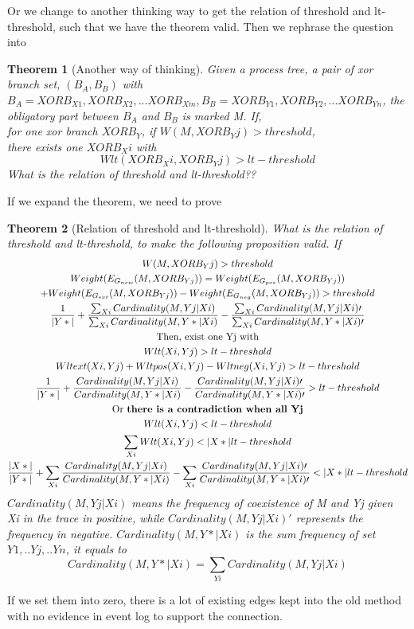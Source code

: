 \documentclass[]{article}
\newtheorem{mytheorem}{Theorem}[section]
\begin{document}
Or we change to another thinking way to get the relation of threshold and lt-threshold, such that we have the theorem valid. Then we rephrase the question into
\begin{mytheorem}[Another way of thinking]
	Given a process tree, a pair of xor branch set, $(B_A,B_B)$ with $B_A={XORB_{X1}, XORB_{X2},...XORB_{Xm}}, B_B={XORB_{Y1}, XORB_{Y2},...XORB_{Yn}}$, the obligatory part between $B_A$ and $B_B$ is marked M. If,\\
	for one xor branch $XORB_Y$, if $W(M, XORB_Yj) > threshold$, \\ there exists one $XORB_Xi$ with 
	\[Wlt(XORB_Xi, XORB_Yj)> lt-threshold\]
	What is the relation of threshold and lt-threshold?? 
\end{mytheorem}
If we expand the theorem, we need to prove 
\begin{mytheorem}[Relation of threshold and lt-threshold]
	What is the relation of threshold and lt-threshold, to make the following proposition valid. If 
	\begin{equation*}
	 \begin{gathered}
		W(M, XORB_Yj)  > threshold \\
	Weight(E_{G_{new}}(M, XORB_{Yj})) = Weight(E_{G_{pos}}(M, XORB_{Yj})) \\
	+ Weight(E_{G_{ext}}(M, XORB_{Yj})) 
	- Weight(E_{G_{neg}}(M, XORB_{Yj}))  > threshold \\
	\frac{1}{|Y*|} + \frac{\sum_{Xi}{Cardinality(M,Yj|Xi)}} {\sum_{Xi}{Cardinality(M,Y*|Xi)}}  
	- \frac{\sum_{Xi}{Cardinality(M,Yj|Xi)\prime}} {\sum_{Xi}{Cardinality(M,Y*|Xi)\prime}} \\
	\text{Then, exist one Yj with}\\
	Wlt(Xi, Yj)> lt-threshold \\
	Wlt{ext}(Xi, Yj) + Wlt{pos}(Xi, Yj) -Wlt{neg}(Xi, Yj) > lt-threshold\\
	\frac{1}{|Y*|} + \frac{Cardinality(M,Yj|Xi)} {Cardinality(M,Y*|Xi)}  
	- \frac{Cardinality(M,Yj|Xi)\prime} {Cardinality(M,Y*|Xi)\prime} > lt-threshold  \\
	\text{Or \textbf{there is a contradiction when all Yj}}\\
	Wlt(Xi, Yj)< lt-threshold\\
	\sum_{Xi} Wlt(Xi, Yj) < |X*|lt-threshold \\
	\frac{|X*|}{|Y*|} + \sum_{Xi}\frac{Cardinality(M,Yj|Xi)} {Cardinality(M,Y*|Xi)}  
	- \sum_{Xi}\frac{Cardinality(M,Yj|Xi)\prime} {Cardinality(M,Y*|Xi)\prime} < |X*|lt-threshold  \\
	 \end{gathered}
	\end{equation*}	
$Cardinality(M,Yj|Xi)$ means the frequency of coexistence of M and Yj given Xi in the trace in positive, while $Cardinality(M,Yj|Xi)\prime$ represents the frequency in negative. $Cardinality(M,Y*|Xi)$ is the sum frequency of set ${Y1,..Yj,..Yn}$, it equals to \[Cardinality(M,Y*|Xi) = \sum_{Yi}Cardinality(M,Yj|Xi)\]
\end{mytheorem}
If we set them into zero, there is a lot of existing edges kept into the old method with no evidence in event log to support the connection. 
\end{document}
